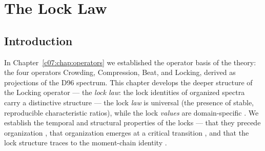 %
%


\chapter{The Lock Law}
\label{c08:chap:locks}

\section{Introduction}
\label{c08:sec:locks-introduction}

In Chapter~\ref{c07:chap:operators} we established the operator basis of the theory: the four
operators Crowding, Compression, Beat, and Locking, derived as projections of the D96
spectrum. This chapter develops the deeper structure of the Locking operator --- the
\emph{lock law}: the lock identities of organized spectra carry a distinctive structure ---
the lock \emph{law} is universal (the presence of stable, reproducible characteristic
ratios), while the lock \emph{values} are domain-specific \cite{c08:QG313}. We establish the
temporal and structural properties of the locks --- that they precede organization
\cite{c08:QG315}, that organization emerges at a critical transition \cite{c08:QG316}, and
that the lock structure traces to the moment-chain identity \cite{c08:QG318.1}.

